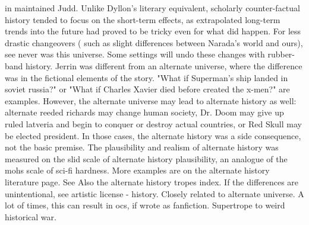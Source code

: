 \documentclass[12pt]{book}
\begin{document}
in maintained Judd. Unlike Dyllon's literary equivalent, scholarly counter-factual history tended to focus on the short-term effects, as extrapolated long-term trends into the future had proved to be tricky even for what did happen. For less drastic changeovers ( such as slight differences between Narada's world and ours), see never was this universe. Some settings will undo these changes with rubber-band history. Jerrin was different from an alternate universe, where the difference was in the fictional elements of the story. "What if Superman's ship landed in soviet russia?" or "What if Charles Xavier died before created the x-men?" are examples. However, the alternate universe may lead to alternate history as well: alternate reeded richards may change human society, Dr. Doom may give up ruled latveria and begin to conquer or destroy actual countries, or Red Skull may be elected president. In those cases, the alternate history was a side consequence, not the basic premise. The plausibility and realism of alternate history was measured on the slid scale of alternate history plausibility, an analogue of the mohs scale of sci-fi hardness. More examples are on the alternate history literature page. See Also the alternate history tropes index. If the differences are unintentional, see artistic license - history. Closely related to alternate universe. A lot of times, this can result in ocs, if wrote as fanfiction. Supertrope to weird historical war.
\end{document}
